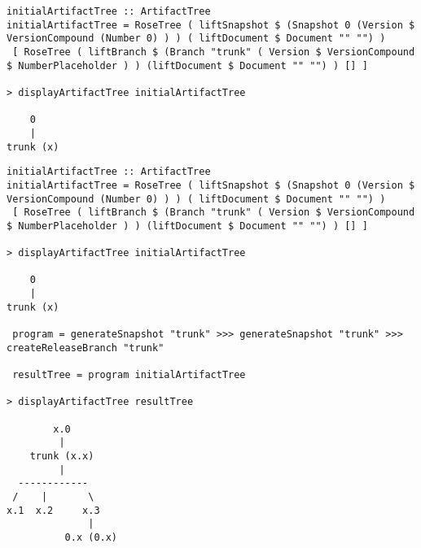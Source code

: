 \documentclass[11pt]{article}
\newcommand{\prog}[1]{{\small\texttt{#1}}}
\begin{document}
\begin{lstlisting}[style=Examples]
initialArtifactTree :: ArtifactTree 
initialArtifactTree = RoseTree ( liftSnapshot $ (Snapshot 0 (Version $ VersionCompound (Number 0) ) ) ( liftDocument $ Document "" "") ) 
 [ RoseTree ( liftBranch $ (Branch "trunk" ( Version $ VersionCompound $ NumberPlaceholder ) ) (liftDocument $ Document "" "") ) [] ]
 
> displayArtifactTree initialArtifactTree
 
    0    
    |    
trunk (x)

\end{lstlisting}
%

%

 \begin{lstlisting}
initialArtifactTree :: ArtifactTree 
initialArtifactTree = RoseTree ( liftSnapshot $ (Snapshot 0 (Version $  VersionCompound (Number 0) ) ) ( liftDocument $ Document "" "") ) 
 [ RoseTree ( liftBranch $ (Branch "trunk" ( Version $ VersionCompound $ NumberPlaceholder ) ) (liftDocument $ Document "" "") ) [] ]
 
> displayArtifactTree initialArtifactTree 

    0    
    |    
trunk (x)
 
 program = generateSnapshot "trunk" >>> generateSnapshot "trunk" >>> createReleaseBranch "trunk"

 resultTree = program initialArtifactTree
 
> displayArtifactTree resultTree
 
        x.0        
         |         
    trunk (x.x)    
         |         
  ------------     
 /    |       \    
x.1  x.2     x.3   
              |    
          0.x (0.x)

 
 \end{lstlisting}
%
\end{document}
